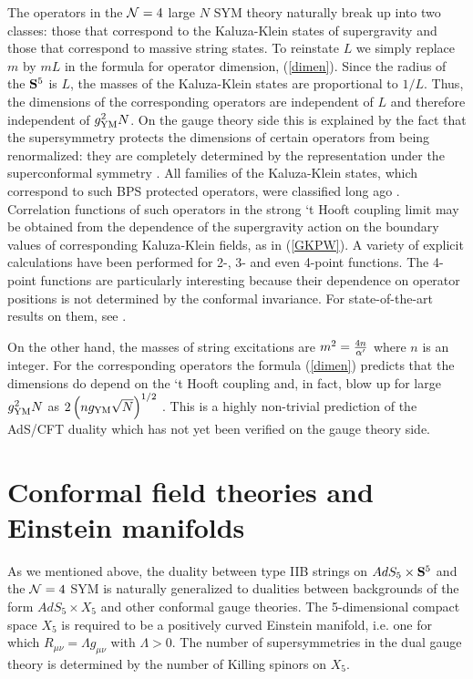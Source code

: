 The operators in the ${\cal N}=4$ large $N$ SYM theory
naturally break up into two classes: those that correspond to the
Kaluza-Klein states of supergravity and those that correspond to 
massive string states.
To reinstate
$L$ we simply replace $m$ by $mL$ in the formula for
operator dimension, (\ref{dimen}). Since the radius of the ${\bf S}^5$
is $L$, the masses of the Kaluza-Klein states are
proportional to $1/L$. Thus,
the dimensions of the corresponding operators are independent of $L$ and
therefore independent of $g_{\rm YM}^2 N$.
On the gauge theory side this
is explained by the fact that the supersymmetry protects the dimensions
of certain operators from being renormalized: they are completely determined
by the representation under the superconformal symmetry 
\cite{hw,Ferrara}.
All families of the Kaluza-Klein states, which correspond to such
BPS protected operators, were classified long ago \cite{Kim}.
Correlation functions of such operators in the strong `t Hooft coupling
limit may be obtained from the dependence of the supergravity action
on the boundary values of corresponding Kaluza-Klein fields, as in
(\ref{GKPW}). A variety of explicit calculations have been performed for
2-, 3- and even 4-point functions. The 4-point functions are
particularly interesting because their dependence on operator positions
is not determined by the conformal invariance. For state-of-the-art
results on them, see \cite{DFM,Arut}.

On the other hand, the masses of string excitations are
$m^2 = {4 n\over \alpha'}$ where $n$ is an integer.
For the corresponding operators the formula (\ref{dimen})
predicts that the dimensions do depend on the `t Hooft coupling and,
in fact, blow up for large $g_{\rm YM}^2 N$ as
$2\left (n g_{\rm YM} \sqrt {N} \right )^{1/2}$ \cite{US}.
This is a highly non-trivial prediction of the AdS/CFT duality which
has not yet been verified on the gauge theory side.


\section{Conformal field theories and Einstein manifolds}

As we mentioned above, the duality between 
type IIB strings on $AdS_5\times {\bf S}^5$
and the ${\cal N}=4$ SYM is naturally generalized to dualities between
backgrounds of the form  $AdS_5\times X_5$ and other conformal gauge theories.
The 5-dimensional compact space $X_5$ is required to be a
positively curved Einstein manifold, i.e. one for which
$R_{\mu\nu}= \Lambda g_{\mu\nu}$ with $\Lambda>0$.
The number of supersymmetries in the dual gauge theory is determined
by the number of Killing spinors on $X_5$.


